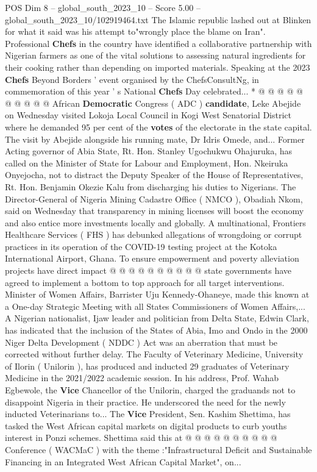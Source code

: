 \begin{textsample}{POS Dim 8 – global\_south\_2023\_10 – Score 5.00 – global\_south\_2023\_10/102919464.txt}
The Islamic republic lashed out at Blinken for what it said was his attempt to"wrongly place the blame on Iran".
Professional \textbf{Chefs} in the country have identified a collaborative partnership with Nigerian farmers as one of the vital solutions to assessing natural ingredients for their cooking rather than depending on imported materials.
Speaking at the 2023 \textbf{Chefs} Beyond Borders ' event organised by the ChefsConsultNg, in commemoration of this year ' s National \textbf{Chefs} Day celebrated... * @ @ @ @ @ @ @ @ @ @ African \textbf{Democratic} Congress ( ADC ) \textbf{candidate}, Leke Abejide on Wednesday visited Lokoja Local Council in Kogi West Senatorial District where he demanded 95 per cent of the \textbf{votes} of the electorate in the state capital.
The visit by Abejide alongside his running mate, Dr Idris Omede, and...
Former Acting governor of Abia State, Rt.
Hon.
Stanley Ugochukwu Ohajuruka, has called on the Minister of State for Labour and Employment, Hon.
Nkeiruka Onyejocha, not to distract the Deputy Speaker of the House of Representatives, Rt.
Hon.
Benjamin Okezie Kalu from discharging his duties to Nigerians.
The Director-General of Nigeria Mining Cadastre Office ( NMCO ), Obadiah Nkom, said on Wednesday that transparency in mining licenses will boost the economy and also entice more investments locally and globally.
A multinational, Frontiers Healthcare Services ( FHS ) has debunked allegations of wrongdoing or corrupt practices in its operation of the COVID-19 testing project at the Kotoka International Airport, Ghana.
To ensure empowerment and poverty alleviation projects have direct impact @ @ @ @ @ @ @ @ @ @ state governments have agreed to implement a bottom to top approach for all target interventions.
Minister of Women Affairs, Barrister Uju Kennedy-Ohaneye, made this known at a One-day Strategic Meeting with all States Commissioners of Women Affairs,...
A Nigerian nationalist, Ijaw leader and politician from Delta State, Edwin Clark, has indicated that the inclusion of the States of Abia, Imo and Ondo in the 2000 Niger Delta Development ( NDDC ) Act was an aberration that must be corrected without further delay.
The Faculty of Veterinary Medicine, University of Ilorin ( Unilorin ), has produced and inducted 29 graduates of Veterinary Medicine in the 2021/2022 academic session.
In his address, Prof.
Wahab Egbewole, the \textbf{Vice} Chancellor of the Unilorin, charged the graduands not to disappoint Nigeria in their practice.
He underscored the need for the newly inducted Veterinarians to...
The \textbf{Vice} President, Sen.
Kashim Shettima, has tasked the West African capital markets on digital products to curb youths interest in Ponzi schemes.
Shettima said this at @ @ @ @ @ @ @ @ @ @ Conference ( WACMaC ) with the theme :"Infrastructural Deficit and Sustainable Financing in an Integrated West African Capital Market", on...

\end{textsample}
